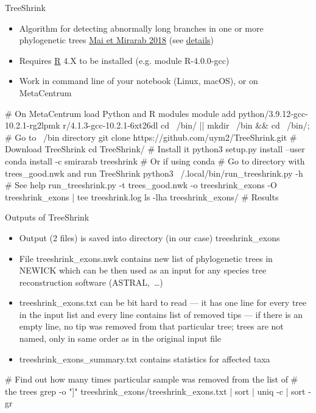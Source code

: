\documentclass[compress, ucs, xelatex, 11pt, xcolor=x11names, aspectratio=169,
	hyperref={
		bookmarks=true,
		unicode=true,
		colorlinks=true,
		pdftitle={HybSeq course},
		plainpages=false,
		pdfauthor={Vojtech Zeisek},
		pdfsubject={Practical processing of HybSeq target enrichment sequencing data on computing grids like MetaCentrum},
		pdfcreator={XeLaTeX},
		pdfkeywords={BASH, command line, GNU, HybSeq, Linux, MetaCentrum, sequencing shell, target enrichment},
		linkcolor=Turquoise4, %
		anchorcolor=DodgerBlue4, %
		citecolor=DodgerBlue4, %
		filecolor=DodgerBlue4, %
		menucolor=Tan4, %
		urlcolor=DarkOliveGreen4, %
		pdftex},
	url={hyphens, lowtilde} %
	]{beamer}
\renewcommand{\texttt}[1]{\colorbox{Cornsilk2}{{\ttfamily #1}}}
\begin{document}
\begin{frame}[fragile]{TreeShrink}
	\begin{itemize}
		\item Algorithm for detecting abnormally long branches in one or more phylogenetic trees \href{https://bmcgenomics.biomedcentral.com/articles/10.1186/s12864-018-4620-2}{Mai et Mirarab 2018} (see \href{https://github.com/uym2/TreeShrink}{details})
		\item Requires \href{https://www.r-project.org/}{R} 4.X to be installed (e.g. module \texttt{R-4.0.0-gcc})
		\item Work in command line of your notebook (Linux, macOS), or on MetaCentrum
	\end{itemize}
	\begin{bashcode}
    # On MetaCentrum load Python and R modules
    module add python/3.9.12-gcc-10.2.1-rg2lpmk r/4.1.3-gcc-10.2.1-6xt26dl
    cd ~/bin/ || { mkdir ~/bin && cd ~/bin/; } # Go to ~/bin directory
    git clone https://github.com/uym2/TreeShrink.git # Download TreeShrink
    cd TreeShrink/ # Install it
    python3 setup.py install --user
    conda install -c smirarab treeshrink # Or if using conda
    # Go to directory with trees_good.nwk and run TreeShrink
    python3 ~/.local/bin/run_treeshrink.py -h # See help
    run_treeshrink.py -t trees_good.nwk -o treeshrink_exons -O
      treeshrink_exons | tee treeshrink.log
    ls -lha treeshrink_exons/ # Results
	\end{bashcode}
\end{frame}

\begin{frame} [fragile]{Outputs of TreeShrink}
	\begin{itemize}
		\item Output (2 files) is saved into directory (in our case) \texttt{treeshrink\_exons}
		\item File \texttt{treeshrink\_exons.nwk} contains new list of phylogenetic trees in \texttt{NEWICK} which can be then used as an input for any species tree reconstruction software (ASTRAL,~\ldots)
		\item \texttt{treeshrink\_exons.txt} can be bit hard to read --- it has one line for every tree in the input list and every line contains list of removed tips --- if there is an empty line, no tip was removed from that particular tree; trees are not named, only in same order as in the original input file
		\item \texttt{treeshrink\_exons\_summary.txt} contains statistics for affected taxa
	\end{itemize}
	\begin{bashcode}
    # Find out how many times particular sample was removed from the list of
    # the trees
    grep -o "\<[[:graph:]]\+\>" treeshrink_exons/treeshrink_exons.txt | sort
      | uniq -c | sort -gr
	\end{bashcode}
\end{frame}
\end{document}

